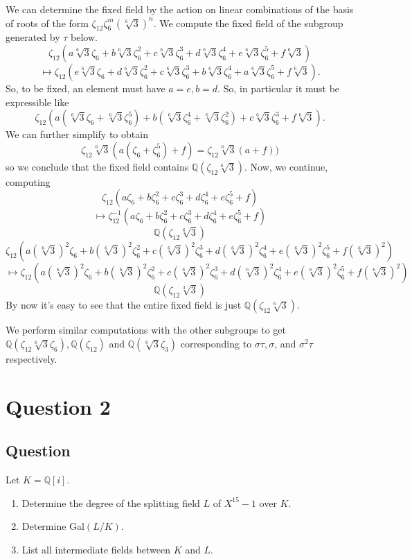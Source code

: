 \documentclass[11pt]{article}
\begin{document}
\begin{enumerate}
We can determine the fixed field by the action on linear combinations of the basis of roots of the form $ \zeta_{12}\zeta_6^m (\sqrt[6]3)^n$. We compute the fixed field of the subgroup generated by $\tau$ below.
\[ \zeta_{12}( a \sqrt[6]3 \zeta_6 + b \sqrt[6]3 \zeta_6^2 + c \sqrt[6]3 \zeta_6^3 + d \sqrt[6]3 \zeta_6^4 + e \sqrt[6]3 \zeta_6^5 + f \sqrt[6]3)\]
\[  \mapsto \zeta_{12}(e \sqrt[6]3 \zeta_6 + d \sqrt[6]3 \zeta_6^2 + c \sqrt[6]3 \zeta_6^3 + b \sqrt[6]3 \zeta_6^4 + a \sqrt[6]3 \zeta_6^5 + f \sqrt[6]3).\]
So, to be fixed, an element must have $a=e, b=d$. So, in particular it must be expressible like
\[ \zeta_{12}( a ( \sqrt[6]3 \zeta_6+ \sqrt[6]3 \zeta_6^5) +  b( \sqrt[6]3 \zeta_6^4  + \sqrt[6]3 \zeta_6^2) + c \sqrt[6]3 \zeta_6^3   + f \sqrt[6]3 ).\]
We can further simplify to obtain
\[  \zeta_{12} \sqrt[6]3( a ( \zeta_6+  \zeta_6^5) + f ) =  \zeta_{12}\sqrt[6]3( a  + f ))\]
so we conclude that the fixed field contains $\mathbb{Q}( \zeta_{12}\sqrt[6]3)$.
Now, we continue, computing
\[ \zeta_{12}( a  \zeta_6 + b \zeta_6^2 + c  \zeta_6^3 + d \zeta_6^4 + e  \zeta_6^5 + f )\]
\[ \mapsto \zeta_{12}^{-1}( a  \zeta_6 + b \zeta_6^2 + c  \zeta_6^3 + d \zeta_6^4 + e  \zeta_6^5 + f) \]
\[\mathbb{Q}( \zeta_{12}\sqrt[6]3)\]
\[   \zeta_{12}(a (\sqrt[6]3)^2 \zeta_6 + b (\sqrt[6]3)^2 \zeta_6^2 + c (\sqrt[6]3)^2 \zeta_6^3 + d (\sqrt[6]3)^2 \zeta_6^4 + e (\sqrt[6]3)^2 \zeta_6^5 + f (\sqrt[6]3)^2)\]
\[ \mapsto \zeta_{12}( a (\sqrt[6]3)^2 \zeta_6 + b (\sqrt[6]3)^2 \zeta_6^2 + c (\sqrt[6]3)^2 \zeta_6^3 + d (\sqrt[6]3)^2 \zeta_6^4 + e (\sqrt[6]3)^2 \zeta_6^5 + f (\sqrt[6]3)^2)\]
\[\mathbb{Q}( \zeta_{12}\sqrt[3]3)\]
By now it's easy  to see that the entire fixed field is just $\mathbb{Q}(\zeta_{12}\sqrt[6]3)$.


We perform similar computations with the other subgroups to get $\mathbb{Q}( \zeta_{12} \sqrt[6]3 \zeta_6 ), \mathbb{Q}( \zeta_{12})$ and $\mathbb{Q}(\sqrt[6]3 \zeta_3)$ corresponding to $\sigma \tau, \sigma$, and $\sigma^2 \tau$ respectively. 


\end{enumerate}

\section{Question 2}
\subsection{Question}
Let $K = \mathbb{Q}[i]$.
\begin{enumerate}
\item Determine the degree of the splitting field $L$ of $X^{15} -1$ over $K$.
\item Determine Gal$(L/K)$.
\item List all intermediate fields between $K$ and $L$.
\end{enumerate}
\end{document}
